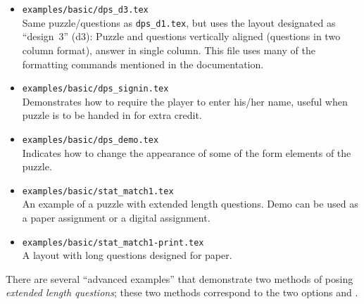 \documentclass{article}
\begin{document}
\begin{itemize}
    \item \texttt{examples/basic/dps\_d3.tex}\\ Same puzzle/questions as
        \texttt{dps\_d1.tex}, but uses the layout designated as
        ``design~3'' (d3): Puzzle and questions vertically aligned
        (questions in two column format), answer in single column. This
        file uses many of the formatting commands mentioned in the
        documentation.
    \item \texttt{examples/basic/dps\_signin.tex}\\ Demonstrates how to require
    the player to enter his/her name, useful when puzzle is to be handed
    in for extra credit.
    \item \texttt{examples/basic/dps\_demo.tex}\\ Indicates how to change the appearance
    of some of the form elements of the puzzle.
    \item \texttt{examples/basic/stat\_match1.tex}\\
      An example of a puzzle with extended length questions. Demo can be
      used as a paper assignment or a digital assignment.
    \item\texttt{examples/basic/stat\_match1-print.tex}\\
      A layout with long questions designed for paper.
\end{itemize}
There are several ``advanced examples'' that demonstrate two methods
of posing \emph{extended length questions}; these two methods correspond to the two
options  and .
\end{document}
